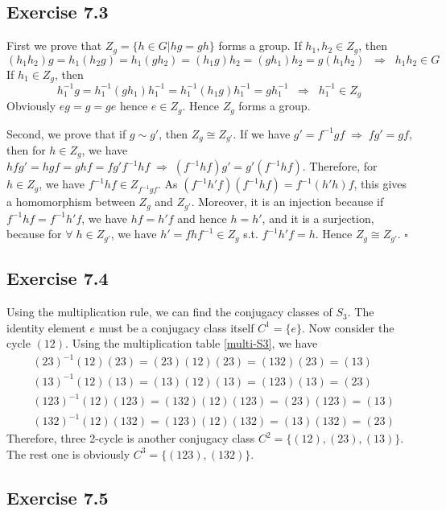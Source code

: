 \documentclass[]{ctexart}
\begin{document}
\subsection{Exercise 7.3}
First we prove that $Z_g=\{h\in G|hg=gh\}$ forms a group. If $h_1,h_2\in Z_g$, then 
\begin{equation*}
(h_1h_2)g=h_1(h_2g)=h_1(gh_2)=(h_1g)h_2=(gh_1)h_2=g(h_1h_2)\;\;\Rightarrow\;\;h_1h_2\in G
\end{equation*}
If $h_1\in Z_g$, then 
\begin{equation*}
h_1^{-1}g=h_1^{-1}(gh_1)h_1^{-1}=h_1^{-1}(h_1g)h_1^{-1}=gh_1^{-1}\;\;\Rightarrow\;\;h_1^{-1}\in Z_g
\end{equation*}
Obviously $eg=g=ge$ hence $e\in Z_g$. Hence $Z_g$ forms a group. 

Second, we prove that if $g\sim g'$, then $Z_g\cong Z_{g'}$. If we have $g'=f^{-1}gf\;\Rightarrow\;fg'=gf$, then for $h\in Z_g$, we have $hfg'=hgf=ghf=fg'f^{-1}hf\;\Rightarrow\;(f^{-1}hf)g'=g'(f^{-1}hf)$. Therefore, for $h\in Z_g$, 
we have $f^{-1}hf\in Z_{f^{-1}gf}$. As $(f^{-1}h'f)(f^{-1}hf)=f^{-1}(h'h)f$, this gives a homomorphism between $Z_g$ and $Z_{g'}$. Moreover, it is an
injection because if $f^{-1}hf=f^{-1}h'f$, we have $hf=h'f$ and hence $h=h'$, and it is a surjection, because for $\forall\;h\in Z_{g'}$, we have $h'=fhf^{-1}\in Z_{g}$ s.t. $f^{-1}h'f=h$. 
Hence $Z_g\cong Z_{g'}$. $\square$ 

\subsection{Exercise 7.4}
Using the multiplication rule, we can find the conjugacy classes of $S_3$. The identity element $e$ must be a conjugacy class itself $C^1=\{e\}$. Now consider 
the cycle $(12)$. Using the multiplication table \eqref{multi-S3}, we have 
\begin{align*}
&(23)^{-1}(12)(23)=(23)(12)(23)=(132)(23)=(13)\\
&(13)^{-1}(12)(13)=(13)(12)(13)=(123)(13)=(23)\\
&(123)^{-1}(12)(123)=(132)(12)(123)=(23)(123)=(13)\\
&(132)^{-1}(12)(132)=(123)(12)(132)=(13)(132)=(23)
\end{align*}
Therefore, three 2-cycle is another conjugacy class $C^2=\{(12),(23),(13)\}$. The rest one is obviously $C^3=\{(123),(132)\}$. 

\subsection{Exercise 7.5}
\end{document}
